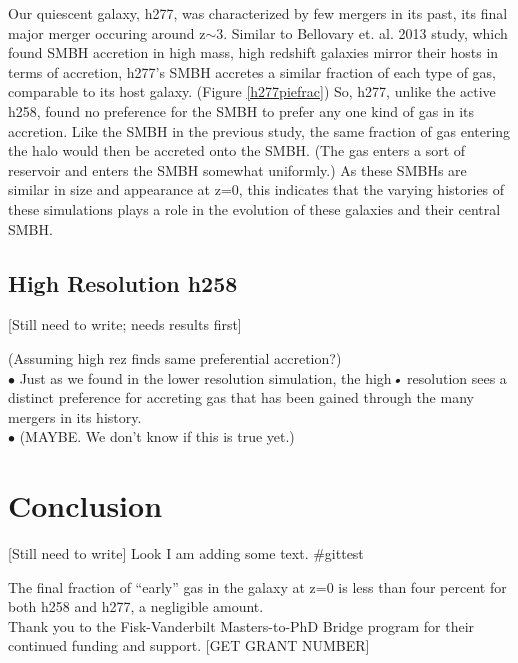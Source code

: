 \documentclass[manuscript]{aastex}
\begin{document}
Our quiescent galaxy, h277, was characterized by few mergers in its past, its final major merger occuring around z$\sim$3. Similar to Bellovary et. al. 2013 study, which found SMBH accretion in high mass, high redshift galaxies mirror their hosts in terms of accretion, h277's SMBH accretes a similar fraction of each type of gas, comparable to its host galaxy. (Figure \ref{h277piefrac}) So, h277, unlike the active h258, found no preference for the SMBH to prefer any one kind of gas in its accretion. Like the SMBH in the previous study, the same fraction of gas entering the halo would then be accreted onto the SMBH. (The gas enters a sort of reservoir and enters the SMBH somewhat uniformly.)  As these SMBHs are similar in size and appearance at z=0, this indicates that the varying histories of these simulations plays a role in the evolution of these galaxies and their central SMBH.
	

\subsection{High Resolution h258}

[Still need to write; needs results first]

(Assuming high rez finds same preferential accretion?)\\
$\bullet$ Just as we found in the lower resolution simulation, the high\textit{•} resolution sees a distinct preference for accreting gas that has been gained through the many mergers in its history. \\
$\bullet$ (MAYBE. We don't know if this is true yet.)\\


\section{Conclusion}

[Still need to write]
Look I am adding some text. #gittest

The final fraction of ``early'' gas in the galaxy at z=0 is less than four percent for both h258 and h277, a negligible amount.  \\


\acknowledgments
Thank you to the Fisk-Vanderbilt Masters-to-PhD Bridge program for their continued funding and support. [GET GRANT NUMBER]
\end{document}
